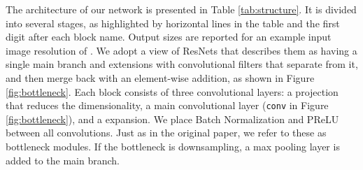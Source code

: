 \documentclass{article}
\begin{document}
The architecture of our network is presented in Table \ref{tab:structure}.
It is divided into several stages, as highlighted by horizontal lines in the table and the first digit after each block name.
Output sizes are reported for an example input image resolution of .
We adopt a view of ResNets \cite{he2015resnet} that describes them as having a single main branch and extensions with convolutional filters that separate from it, and then merge back with an element-wise addition, as shown in Figure \ref{fig:bottleneck}.
Each block consists of three convolutional layers: a  projection that reduces the dimensionality, a main convolutional layer (\texttt{conv} in Figure \ref{fig:bottleneck}), and a  expansion.
We place Batch Normalization \cite{ioffe2015batchnorm} and PReLU \cite{he2015} between all convolutions.
Just as in the original paper, we refer to these as bottleneck modules.
If the bottleneck is downsampling, a max pooling layer is added to the main branch.
\end{document}

